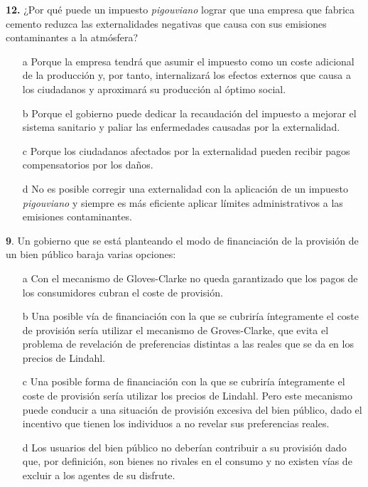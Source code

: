 \documentclass{nuevotema}
\begin{document}

\textbf{12.} ¿Por qué puede un impuesto \textit{pigouviano} lograr que una empresa que fabrica cemento reduzca las externalidades negativas que causa con sus emisiones contaminantes a la atmósfera?

\begin{itemize}
	\item[a] Porque la empresa tendrá que asumir el impuesto como un coste adicional de la producción y, por tanto, internalizará los efectos externos que causa a los ciudadanos y aproximará su producción al óptimo social.
	\item[b] Porque el gobierno puede dedicar la recaudación del impuesto a mejorar el sistema sanitario y paliar las enfermedades causadas por la externalidad.
	\item[c] Porque los ciudadanos afectados por la externalidad pueden recibir pagos compensatorios por los daños.
	\item[d] No es posible corregir una externalidad con la aplicación de un impuesto \textit{pigouviano} y siempre es más eficiente aplicar límites administrativos a las emisiones contaminantes.
\end{itemize}


\textbf{9}. Un gobierno que se está planteando el modo de financiación de la provisión de un bien público baraja varias opciones:

\begin{itemize}
	\item[a] Con el mecanismo de Gloves-Clarke no queda garantizado que los pagos de los consumidores cubran el coste de provisión.
	\item[b] Una posible vía de financiación con la que se cubriría íntegramente el coste de provisión sería utilizar el mecanismo de Groves-Clarke, que evita el problema de revelación de preferencias distintas a las reales que se da en los precios de Lindahl.
	\item[c] Una posible forma de financiación con la que se cubriría íntegramente el coste de provisión sería utilizar los precios de Lindahl. Pero este mecanismo puede conducir a una situación de provisión excesiva del bien público, dado el incentivo que tienen los individuos a no revelar sus preferencias reales.
	\item[d] Los usuarios del bien público no deberían contribuir a su provisión dado que, por definición, son bienes no rivales en el consumo y no existen vías de excluir a los agentes de su disfrute. 
\end{itemize}
\end{document}
